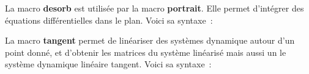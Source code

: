 \Mportrait


La macro {\bf desorb} est utilis\'ee par la
macro {\bf portrait}. Elle permet d'int\'egrer des \'equations
 diff\'erentielles dans le plan. Voici sa syntaxe~:

\Mdesorb


La macro {\bf tangent} permet de lin\'eariser des syst\`emes dynamique
 autour d'un point donn\'e, et d'obtenir les matrices du syst\`eme 
 lin\'earis\'e mais aussi un le syst\`eme dynamique lin\'eaire tangent.
 Voici sa syntaxe~:

\Mtangent





